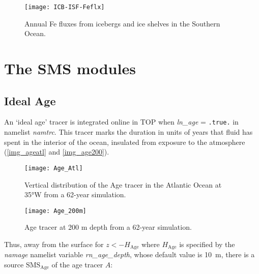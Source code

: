 \documentclass[../main/TOP_manual]{subfiles}
\begin{document}
\begin{figure}[!h]
	\centering
	\texttt{[image: ICB-ISF-Feflx]}
	\caption{Annual Fe fluxes from icebergs and ice shelves in the Southern Ocean.}
	\label{img_icbisf}
\end{figure}


\section{The SMS modules}

\label{SMS_models}

\subsection{Ideal Age}

An `ideal age' tracer is integrated online in TOP when \textit{ln\_age} = \texttt{.true.} in namelist \textit{namtrc}.
This tracer marks the duration in units of years that fluid has spent in the interior of the ocean, insulated from exposure to the atmosphere  (\autoref{img_ageatl} and \autoref{img_age200}).

\begin{figure}[!h]
	\centering
	\texttt{[image: Age\_Atl]}
	\caption{Vertical distribution of the Age tracer in the Atlantic Ocean at 35°W from a 62-year simulation.}
	\label{img_ageatl}
\end{figure}

\begin{figure}[!h]
	\centering
	\texttt{[image: Age\_200m]}
	\caption{Age tracer at 200 m depth from a 62-year simulation.}
	\label{img_age200}
\end{figure}

Thus, away from the surface for $z<-H_{\mathrm{Age}}$ where $H_{\mathrm{Age}}$ is specified by the \textit{namage} namelist variable \textit{rn\_age\_depth}, whose default value is 10~m, there is a source $\mathrm{SMS_{\mathrm{Age}}}$ of the age tracer $A$:
\end{document}
